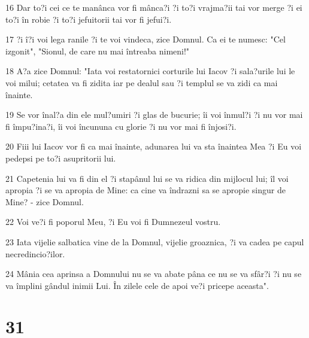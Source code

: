 \par 16 Dar to?i cei ce te manânca vor fi mânca?i ?i to?i vrajma?ii tai vor merge ?i ei to?i în robie ?i to?i jefuitorii tai vor fi jefui?i.
\par 17 ?i î?i voi lega ranile ?i te voi vindeca, zice Domnul. Ca ei te numesc: "Cel izgonit", "Sionul, de care nu mai întreaba nimeni!"
\par 18 A?a zice Domnul: "Iata voi restatornici corturile lui Iacov ?i sala?urile lui le voi milui; cetatea va fi zidita iar pe dealul sau ?i templul se va zidi ca mai înainte.
\par 19 Se vor înal?a din ele mul?umiri ?i glas de bucurie; îi voi înmul?i ?i nu vor mai fi împu?ina?i, îi voi încununa cu glorie ?i nu vor mai fi înjosi?i.
\par 20 Fiii lui Iacov vor fi ca mai înainte, adunarea lui va sta înaintea Mea ?i Eu voi pedepsi pe to?i asupritorii lui.
\par 21 Capetenia lui va fi din el ?i stapânul lui se va ridica din mijlocul lui; îl voi apropia ?i se va apropia de Mine: ca cine va îndrazni sa se apropie singur de Mine? - zice Domnul.
\par 22 Voi ve?i fi poporul Meu, ?i Eu voi fi Dumnezeul vostru.
\par 23 Iata vijelie salbatica vine de la Domnul, vijelie groaznica, ?i va cadea pe capul necredincio?ilor.
\par 24 Mânia cea aprinsa a Domnului nu se va abate pâna ce nu se va sfâr?i ?i nu se va împlini gândul inimii Lui. În zilele cele de apoi ve?i pricepe aceasta".

\chapter{31}

